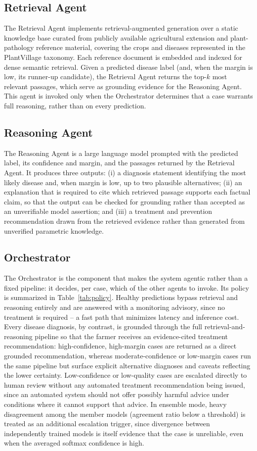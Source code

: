 \documentclass[conference]{IEEEtran}
\begin{document}
\subsection{Retrieval Agent}
The Retrieval Agent implements retrieval-augmented generation over a static knowledge base curated from publicly available agricultural extension and plant-pathology reference material, covering the crops and diseases represented in the PlantVillage taxonomy. Each reference document is embedded and indexed for dense semantic retrieval. Given a predicted disease label (and, when the margin is low, its runner-up candidate), the Retrieval Agent returns the top-$k$ most relevant passages, which serve as grounding evidence for the Reasoning Agent. This agent is invoked only when the Orchestrator determines that a case warrants full reasoning, rather than on every prediction.

\subsection{Reasoning Agent}
The Reasoning Agent is a large language model prompted with the predicted label, its confidence and margin, and the passages returned by the Retrieval Agent. It produces three outputs: (i) a diagnosis statement identifying the most likely disease and, when margin is low, up to two plausible alternatives; (ii) an explanation that is required to cite which retrieved passage supports each factual claim, so that the output can be checked for grounding rather than accepted as an unverifiable model assertion; and (iii) a treatment and prevention recommendation drawn from the retrieved evidence rather than generated from unverified parametric knowledge.

\subsection{Orchestrator}
The Orchestrator is the component that makes the system agentic rather than a fixed pipeline: it decides, per case, which of the other agents to invoke. Its policy is summarized in Table~\ref{tab:policy}. Healthy predictions bypass retrieval and reasoning entirely and are answered with a monitoring advisory, since no treatment is required -- a fast path that minimizes latency and inference cost. Every disease diagnosis, by contrast, is grounded through the full retrieval-and-reasoning pipeline so that the farmer receives an evidence-cited treatment recommendation: high-confidence, high-margin cases are returned as a direct grounded recommendation, whereas moderate-confidence or low-margin cases run the same pipeline but surface explicit alternative diagnoses and caveats reflecting the lower certainty. Low-confidence or low-quality cases are escalated directly to human review without any automated treatment recommendation being issued, since an automated system should not offer possibly harmful advice under conditions where it cannot support that advice. In ensemble mode, heavy disagreement among the member models (agreement ratio below a threshold) is treated as an additional escalation trigger, since divergence between independently trained models is itself evidence that the case is unreliable, even when the averaged softmax confidence is high.
\end{document}
